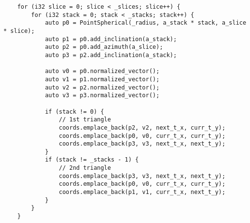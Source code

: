 \begin{lstlisting}
    for (i32 slice = 0; slice < _slices; slice++) {
        for (i32 stack = 0; stack < _stacks; stack++) {
            auto p0 = PointSpherical(_radius, a_stack * stack, a_slice * slice);
            auto p1 = p0.add_inclination(a_stack);
            auto p2 = p0.add_azimuth(a_slice);
            auto p3 = p2.add_inclination(a_stack);

            auto v0 = p0.normalized_vector();
            auto v1 = p1.normalized_vector();
            auto v2 = p2.normalized_vector();
            auto v3 = p3.normalized_vector();

            if (stack != 0) {
                // 1st triangle
                coords.emplace_back(p2, v2, next_t_x, curr_t_y);
                coords.emplace_back(p0, v0, curr_t_x, curr_t_y);
                coords.emplace_back(p3, v3, next_t_x, next_t_y);
            }
            if (stack != _stacks - 1) {
                // 2nd triangle
                coords.emplace_back(p3, v3, next_t_x, next_t_y);
                coords.emplace_back(p0, v0, curr_t_x, curr_t_y);
                coords.emplace_back(p1, v1, curr_t_x, next_t_y);
            }
        }
    }
\end{lstlisting}
